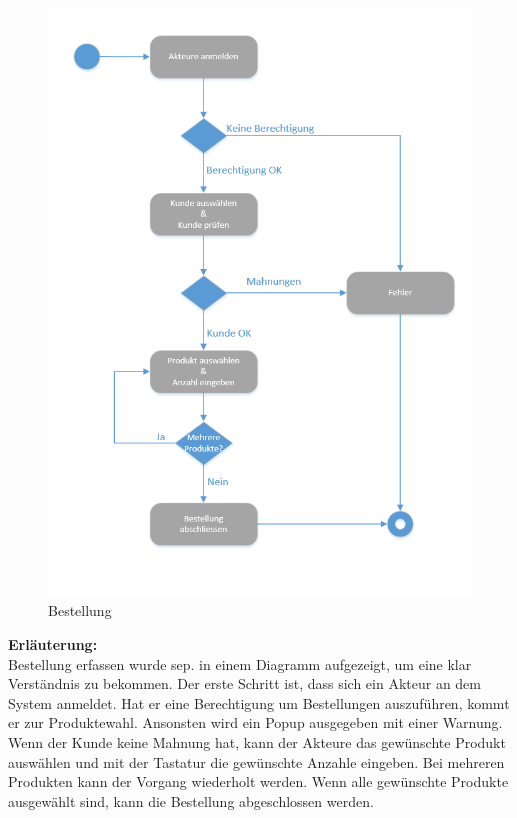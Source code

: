 \begin{figure}[H]
\centering
	\includegraphics[width=0.7\linewidth]{Images/Bestellung}
	\caption{Bestellung}
	\label{fig:kontextdiagram}
\end{figure}
\textbf{Erläuterung:}\\
Bestellung erfassen wurde sep. in einem Diagramm aufgezeigt, um eine klar Verständnis zu bekommen. Der erste Schritt ist, dass sich ein Akteur an dem System anmeldet. Hat er eine Berechtigung um Bestellungen auszuführen, kommt er zur Produktewahl. Ansonsten wird ein Popup ausgegeben mit einer Warnung. 
Wenn der Kunde keine Mahnung hat, kann der Akteure das gewünschte Produkt auswählen und mit der Tastatur die gewünschte Anzahle eingeben. Bei mehreren Produkten kann der Vorgang wiederholt werden. Wenn alle gewünschte Produkte ausgewählt sind, kann die Bestellung abgeschlossen werden.








